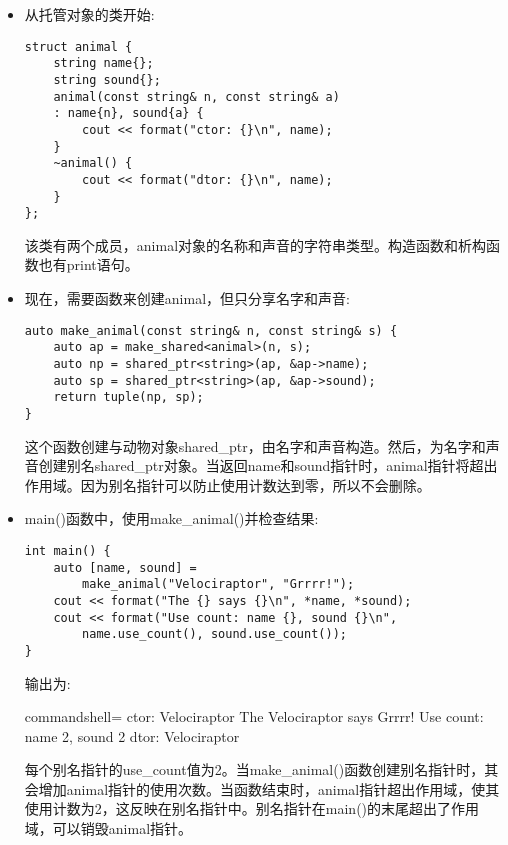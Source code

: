 \begin{itemize}
\item 
从托管对象的类开始:

\begin{lstlisting}[style=styleCXX]
struct animal {
	string name{};
	string sound{};
	animal(const string& n, const string& a)
	: name{n}, sound{a} {
		cout << format("ctor: {}\n", name);
	}
	~animal() {
		cout << format("dtor: {}\n", name);
	}
};
\end{lstlisting}

该类有两个成员，animal对象的名称和声音的字符串类型。构造函数和析构函数也有print语句。

\item 
现在，需要函数来创建animal，但只分享名字和声音:

\begin{lstlisting}[style=styleCXX]
auto make_animal(const string& n, const string& s) {
	auto ap = make_shared<animal>(n, s);
	auto np = shared_ptr<string>(ap, &ap->name);
	auto sp = shared_ptr<string>(ap, &ap->sound);
	return tuple(np, sp);
}
\end{lstlisting}

这个函数创建与动物对象shared\_ptr，由名字和声音构造。然后，为名字和声音创建别名shared\_ptr对象。当返回name和sound指针时，animal指针将超出作用域。因为别名指针可以防止使用计数达到零，所以不会删除。

\item 
main()函数中，使用make\_animal()并检查结果:

\begin{lstlisting}[style=styleCXX]
int main() {
	auto [name, sound] =
		make_animal("Velociraptor", "Grrrr!");
	cout << format("The {} says {}\n", *name, *sound);
	cout << format("Use count: name {}, sound {}\n",
		name.use_count(), sound.use_count());
}
\end{lstlisting}

输出为:

\begin{tcblisting}{commandshell={}}
ctor: Velociraptor
The Velociraptor says Grrrr!
Use count: name 2, sound 2
dtor: Velociraptor
\end{tcblisting}

每个别名指针的use\_count值为2。当make\_animal()函数创建别名指针时，其会增加animal指针的使用次数。当函数结束时，animal指针超出作用域，使其使用计数为2，这反映在别名指针中。别名指针在main()的末尾超出了作用域，可以销毁animal指针。

\end{itemize}

